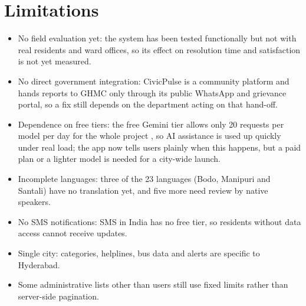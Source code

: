 \documentclass[conference]{IEEEtran}
\begin{document}
\section{Limitations}
\begin{itemize}
\item No field evaluation yet: the system has been tested functionally but not with real residents and ward offices, so its effect on resolution time and satisfaction is not yet measured.
\item No direct government integration: CivicPulse is a community platform and hands reports to GHMC only through its public WhatsApp and grievance portal, so a fix still depends on the department acting on that hand-off.
\item Dependence on free tiers: the free Gemini tier allows only 20 requests per model per day for the whole project \cite{b19}, so AI assistance is used up quickly under real load; the app now tells users plainly when this happens, but a paid plan or a lighter model is needed for a city-wide launch.
\item Incomplete languages: three of the 23 languages (Bodo, Manipuri and Santali) have no translation yet, and five more need review by native speakers.
\item No SMS notifications: SMS in India has no free tier, so residents without data access cannot receive updates.
\item Single city: categories, helplines, bus data and alerts are specific to Hyderabad.
\item Some administrative lists other than users still use fixed limits rather than server-side pagination.
\end{itemize}
\end{document}
